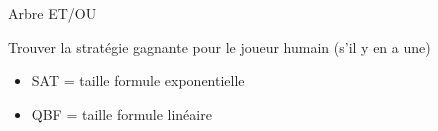 \documentclass[english,french,usenames,dvipsnames]{beamer}
\begin{document}
\begin{frame}{\subsecname}
Arbre ET/OU
\end{frame}


\begin{frame}{\subsecname}
Trouver la stratégie gagnante pour le {\color{ForestGreen}joueur humain} (s'il y en a une)
\begin{itemize}
    \item SAT = taille formule exponentielle
    \item QBF = taille formule linéaire
\end{itemize}
\end{frame}
\end{document}
